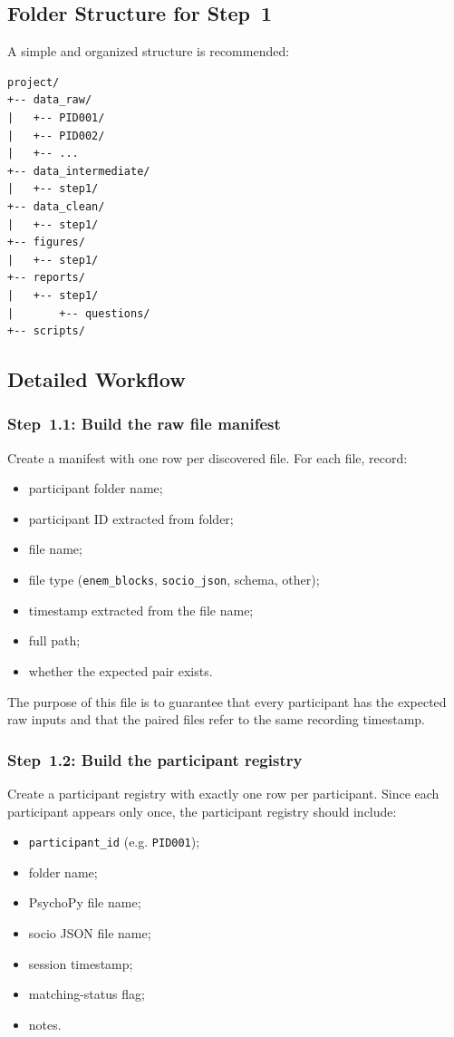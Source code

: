 \documentclass[11pt]{article}
\begin{document}
\subsection{Folder Structure for Step~1}
A simple and organized structure is recommended:
\begin{verbatim}
project/
+-- data_raw/
|   +-- PID001/
|   +-- PID002/
|   +-- ...
+-- data_intermediate/
|   +-- step1/
+-- data_clean/
|   +-- step1/
+-- figures/
|   +-- step1/
+-- reports/
|   +-- step1/
|       +-- questions/
+-- scripts/
\end{verbatim}

\subsection{Detailed Workflow}

\subsubsection{Step~1.1: Build the raw file manifest}
Create a manifest with one row per discovered file.
For each file, record:
\begin{itemize}
    \item participant folder name;
    \item participant ID extracted from folder;
    \item file name;
    \item file type (\texttt{enem\_blocks}, \texttt{socio\_json}, schema, other);
    \item timestamp extracted from the file name;
    \item full path;
    \item whether the expected pair exists.
\end{itemize}

The purpose of this file is to guarantee that every participant has the expected raw inputs and that
the paired files refer to the same recording timestamp.

\subsubsection{Step~1.2: Build the participant registry}
Create a participant registry with exactly one row per participant.
Since each participant appears only once, the participant registry should include:
\begin{itemize}
    \item \texttt{participant\_id} (e.g. \texttt{PID001});
    \item folder name;
    \item PsychoPy file name;
    \item socio JSON file name;
    \item session timestamp;
    \item matching-status flag;
    \item notes.
\end{itemize}
\end{document}
